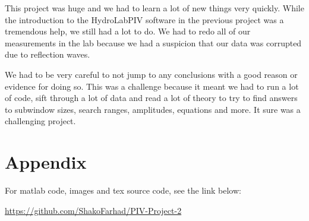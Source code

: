 \documentclass[english,a4paper,12pt]{article}
\begin{document}
This project was huge and we had to learn a lot of new things very quickly. While the introduction to the HydroLabPIV software in the previous project was a tremendous help, we still had a lot to do. We had to redo all of our measurements in the lab because we had a suspicion that our data was corrupted due to reflection waves.\\ \bigskip

We had to be very careful to not jump to any conclusions with a good reason or evidence for doing so. This was a challenge because it meant we had to run a lot of code, sift through a lot of data and read a lot of theory to try to find answers to subwindow sizes, search ranges, amplitudes, equations and more. It sure was a challenging project.


\section*{Appendix}
For matlab code, images and tex source code, see the link below:

\url{https://github.com/ShakoFarhad/PIV-Project-2}


 \bigskip \bigskip
\end{document}

